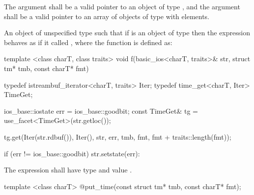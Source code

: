 \begin{itemdescr}
\pnum
\requires The argument  shall be a valid pointer to an object of type , and the argument  shall be a valid pointer to an array of objects of type  with  elements.

\pnum
\returns An object of unspecified type such that if  is an object of type
 then the expression  behaves as if it called , where the function  is
defined as:

\begin{codeblock}
template <class charT, class traits>
void f(basic_ios<charT, traits>& str, struct tm* tmb, const charT* fmt) {
  typedef istreambuf_iterator<charT, traits> Iter;
  typedef time_get<charT, Iter> TimeGet;

  ios_base::iostate err = ios_base::goodbit;
  const TimeGet& tg = use_facet<TimeGet>(str.getloc());

  tg.get(Iter(str.rdbuf()), Iter(), str, err, tmb,
    fmt, fmt + traits::length(fmt));

  if (err != ios_base::goodbit)
    str.setstate(err):
}
\end{codeblock}

The expression  shall have type
 and value .
\end{itemdescr}

%
\begin{itemdecl}
template <class charT> @\unspec@ put_time(const struct tm* tmb, const charT* fmt);
\end{itemdecl}

